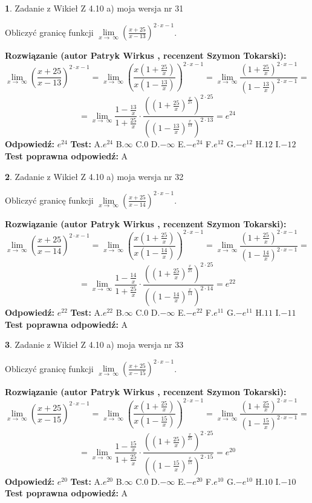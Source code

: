 \documentclass[12pt, a4paper]{article}
\theoremstyle{definition} %
\newtheorem{zad}{}
\newcommand{\zadStart}[1]{\begin{zad}#1\newline}
\newcommand{\zadStop}{\end{zad}}
\newcommand{\rozwStart}[2]{\noindent \textbf{Rozwiązanie (autor #1 , recenzent #2): }\newline}
\newcommand{\rozwStop}{\newline}
\newcommand{\odpStart}{\noindent \textbf{Odpowiedź:}\newline}
\newcommand{\odpStop}{\newline}
\newcommand{\testStart}{\noindent \textbf{Test:}\newline}
\newcommand{\testStop}{\newline}
\newcommand{\kluczStart}{\noindent \textbf{Test poprawna odpowiedź:}\newline}
\newcommand{\kluczStop}{\newline}
\begin{document}
\zadStart{Zadanie z Wikieł Z 4.10 a) moja wersja nr 31}

Obliczyć granicę funkcji  $\lim\limits_{x\to\ \infty}(\frac{x+25}{x-13})^{2\cdot x-1}$.
\zadStop
\rozwStart{Patryk Wirkus}{Szymon Tokarski}
$$\lim\limits_{x\to\ \infty}(\frac{x+25}{x-13})^{2\cdot x-1} = \lim\limits_{x\to\ \infty}(\frac{x(1+\frac{25}{x})}{x(1-\frac{13}{x})})^{2\cdot x-1}=\lim\limits_{x\to\ \infty}\frac{(1+\frac{25}{x})^{2\cdot x-1}}{(1-\frac{13}{x})^{2\cdot x-1}}=$$
$$=\lim\limits_{x\to\ \infty}\frac{1-\frac{13}{x}}{1+\frac{25}{x}}\cdot\frac{((1+\frac{25}{x})^{\frac{x}{25}})^{2\cdot25}}{((1-\frac{13}{x})^{\frac{x}{13}})^{2\cdot13}}=e^{24}$$
\rozwStop
\odpStart
$e^{24}$
\odpStop
\testStart
A.$e^{24}$ B.$\infty$ C.$0$ D.$-\infty$ E.$-e^{24}$
F.$e^{12}$ G.$-e^{12}$
H.$12$
I.$-12$
\testStop
\kluczStart
A
\kluczStop



\zadStart{Zadanie z Wikieł Z 4.10 a) moja wersja nr 32}

Obliczyć granicę funkcji  $\lim\limits_{x\to\ \infty}(\frac{x+25}{x-14})^{2\cdot x-1}$.
\zadStop
\rozwStart{Patryk Wirkus}{Szymon Tokarski}
$$\lim\limits_{x\to\ \infty}(\frac{x+25}{x-14})^{2\cdot x-1} = \lim\limits_{x\to\ \infty}(\frac{x(1+\frac{25}{x})}{x(1-\frac{14}{x})})^{2\cdot x-1}=\lim\limits_{x\to\ \infty}\frac{(1+\frac{25}{x})^{2\cdot x-1}}{(1-\frac{14}{x})^{2\cdot x-1}}=$$
$$=\lim\limits_{x\to\ \infty}\frac{1-\frac{14}{x}}{1+\frac{25}{x}}\cdot\frac{((1+\frac{25}{x})^{\frac{x}{25}})^{2\cdot25}}{((1-\frac{14}{x})^{\frac{x}{14}})^{2\cdot14}}=e^{22}$$
\rozwStop
\odpStart
$e^{22}$
\odpStop
\testStart
A.$e^{22}$ B.$\infty$ C.$0$ D.$-\infty$ E.$-e^{22}$
F.$e^{11}$ G.$-e^{11}$
H.$11$
I.$-11$
\testStop
\kluczStart
A
\kluczStop



\zadStart{Zadanie z Wikieł Z 4.10 a) moja wersja nr 33}

Obliczyć granicę funkcji  $\lim\limits_{x\to\ \infty}(\frac{x+25}{x-15})^{2\cdot x-1}$.
\zadStop
\rozwStart{Patryk Wirkus}{Szymon Tokarski}
$$\lim\limits_{x\to\ \infty}(\frac{x+25}{x-15})^{2\cdot x-1} = \lim\limits_{x\to\ \infty}(\frac{x(1+\frac{25}{x})}{x(1-\frac{15}{x})})^{2\cdot x-1}=\lim\limits_{x\to\ \infty}\frac{(1+\frac{25}{x})^{2\cdot x-1}}{(1-\frac{15}{x})^{2\cdot x-1}}=$$
$$=\lim\limits_{x\to\ \infty}\frac{1-\frac{15}{x}}{1+\frac{25}{x}}\cdot\frac{((1+\frac{25}{x})^{\frac{x}{25}})^{2\cdot25}}{((1-\frac{15}{x})^{\frac{x}{15}})^{2\cdot15}}=e^{20}$$
\rozwStop
\odpStart
$e^{20}$
\odpStop
\testStart
A.$e^{20}$ B.$\infty$ C.$0$ D.$-\infty$ E.$-e^{20}$
F.$e^{10}$ G.$-e^{10}$
H.$10$
I.$-10$
\testStop
\kluczStart
A
\kluczStop
\end{document}

